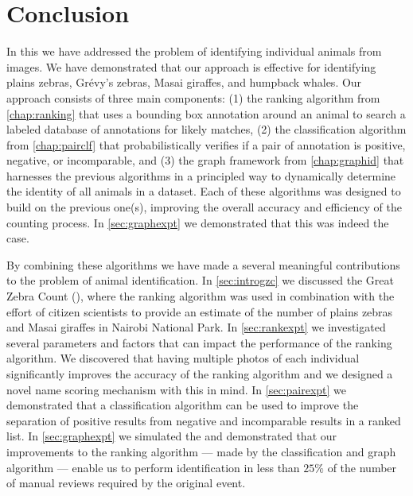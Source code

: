 \begin{comment}
    ./texfix.py --fpaths chapter6-conclusion.tex --outline --asmarkdown --numlines=99 -w
    fixtex --fpaths chapter6-conclusion.tex --outline --asmarkdown --numlines=999 --shortcite
\end{comment}

\chapter{Conclusion}\label{chap:conclusion} 

    In this \thesis{} we have addressed the problem of identifying individual animals from images.
    We have demonstrated that our approach is effective for identifying plains zebras, Grévy's zebras, Masai
      giraffes, and humpback whales.
    Our approach consists of three main components:
    (1) the ranking algorithm from \cref{chap:ranking} that uses a bounding box annotation around an animal to
      search a labeled database of annotations for likely matches,
    (2) the classification algorithm from \cref{chap:pairclf} that probabilistically verifies if a pair of
      annotation is positive, negative, or incomparable, and
    (3) the graph framework from \cref{chap:graphid} that harnesses the previous algorithms in a principled way
      to dynamically determine the identity of all animals in a dataset.
    Each of these algorithms was designed to build on the previous one(s), improving the overall accuracy and
      efficiency of the counting process.
    In \cref{sec:graphexpt} we demonstrated that this was indeed the case.

    By combining these algorithms we have made a several meaningful contributions to the problem of animal
      identification.
    In \cref{sec:introgzc} we discussed the Great Zebra Count (\GZC{}), where the ranking algorithm was used in
      combination with the effort of citizen scientists to provide an estimate of the number of plains zebras and
      Masai giraffes in Nairobi National Park.
    In \cref{sec:rankexpt} we investigated several parameters and factors that can impact the performance of the
      ranking algorithm.
    We discovered that having multiple photos of each individual significantly improves the accuracy of the
      ranking algorithm and we designed a novel name scoring mechanism with this in mind.
    In \cref{sec:pairexpt} we demonstrated that a classification algorithm can be used to improve the separation
      of positive results from negative and incomparable results in a ranked list.
    In \cref{sec:graphexpt} we simulated the \GZC{} and demonstrated that our improvements to the ranking
      algorithm --- made by the classification and graph algorithm --- enable us to perform identification in less
      than $25\percent$ of the number of manual reviews required by the original event.

